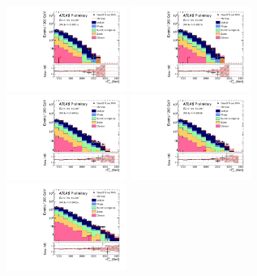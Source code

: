 \begin{figure}[tbph]
\begin{center}
\includegraphics[width=0.35\textwidth]{figures/ATLAS-CONF-2016-078_INT/N-1Plots/AtlasStyle/Preliminary/CRQ_SRJigsawSRG1a_LastCut_CRQ_minusone}
\includegraphics[width=0.35\textwidth]{figures/ATLAS-CONF-2016-078_INT/N-1Plots/AtlasStyle/Preliminary/CRQ_SRJigsawSRG1b_LastCut_CRQ_minusone}
\includegraphics[width=0.35\textwidth]{figures/ATLAS-CONF-2016-078_INT/N-1Plots/AtlasStyle/Preliminary/CRQ_SRJigsawSRG2a_LastCut_CRQ_minusone}
\includegraphics[width=0.35\textwidth]{figures/ATLAS-CONF-2016-078_INT/N-1Plots/AtlasStyle/Preliminary/CRQ_SRJigsawSRG2b_LastCut_CRQ_minusone}
\includegraphics[width=0.35\textwidth]{figures/ATLAS-CONF-2016-078_INT/N-1Plots/AtlasStyle/Preliminary/CRQ_SRJigsawSRG3a_LastCut_CRQ_minusone}

\end{center}
\end{figure}
